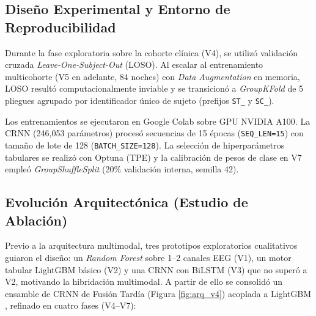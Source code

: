 \documentclass[conference]{IEEEtran}
\begin{document}
\subsection{Diseño Experimental y Entorno de Reproducibilidad}
Durante la fase exploratoria sobre la cohorte clínica (V4), se utilizó validación cruzada \textit{Leave-One-Subject-Out} (LOSO). Al escalar al entrenamiento multicohorte (V5 en adelante, 84 noches) con \textit{Data Augmentation} en memoria, LOSO resultó computacionalmente inviable y se transicionó a \textit{GroupKFold} de 5 pliegues agrupado por identificador único de sujeto (prefijos \texttt{ST\_} y \texttt{SC\_}).

Los entrenamientos se ejecutaron en Google Colab sobre GPU NVIDIA A100. La CRNN (246,053 parámetros) procesó secuencias de 15 épocas (\texttt{SEQ\_LEN=15}) con tamaño de lote de 128 (\texttt{BATCH\_SIZE=128}). La selección de hiperparámetros tabulares se realizó con Optuna (TPE) \cite{akiba2019optuna} y la calibración de pesos de clase en V7 empleó \textit{GroupShuffleSplit} (20\% validación interna, semilla 42).

\subsection{Evolución Arquitectónica (Estudio de Ablación)}
Previo a la arquitectura multimodal, tres prototipos exploratorios cualitativos guiaron el diseño: un \textit{Random Forest} sobre 1--2 canales EEG (V1), un motor tabular LightGBM básico (V2) y una CRNN con BiLSTM (V3) que no superó a V2, motivando la hibridación multimodal. A partir de ello se consolidó un ensamble de CRNN de Fusión Tardía \cite{supratak2017} (Figura \ref{fig:arq_v4}) acoplada a LightGBM \cite{ke2017}, refinado en cuatro fases (V4--V7):
\end{document}

